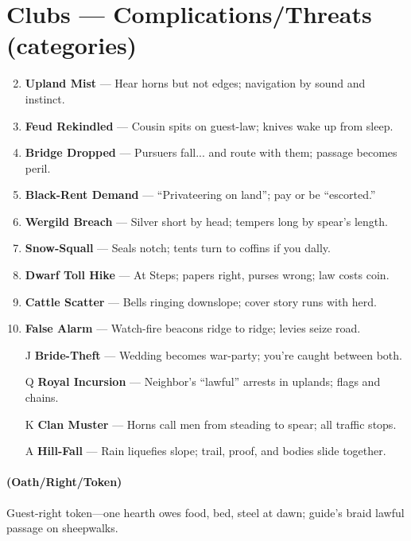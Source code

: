 \section*{Clubs --- Complications/Threats (categories)}
\label{sec:ubral-complications}
\begin{enumerate}
\setcounter{enumi}{1}
\item \textbf{Upland Mist} --- Hear horns but not edges; navigation by sound and instinct.
\item \textbf{Feud Rekindled} --- Cousin spits on guest-law; knives wake up from sleep.
\item \textbf{Bridge Dropped} --- Pursuers fall... and route with them; passage becomes peril.
\item \textbf{Black-Rent Demand} --- ``Privateering on land''; pay or be ``escorted.''
\item \textbf{Wergild Breach} --- Silver short by head; tempers long by spear's length.
\item \textbf{Snow-Squall} --- Seals notch; tents turn to coffins if you dally.
\item \textbf{Dwarf Toll Hike} --- At Steps; papers right, purses wrong; law costs coin.
\item \textbf{Cattle Scatter} --- Bells ringing downslope; cover story runs with herd.
\item \textbf{False Alarm} --- Watch-fire beacons ridge to ridge; levies seize road.
\item[J] \textbf{Bride-Theft} --- Wedding becomes war-party; you're caught between both.
\item[Q] \textbf{Royal Incursion} --- Neighbor's ``lawful'' arrests in uplands; flags and chains.
\item[K] \textbf{Clan Muster} --- Horns call men from steading to spear; all traffic stops.
\item[A] \textbf{Hill-Fall} --- Rain liquefies slope; trail, proof, and bodies slide together.
\end{enumerate}

\paragraph*{(Oath/Right/Token)} Guest-right token---one hearth owes food, bed, steel at dawn; guide's braid lawful passage on sheepwalks.

